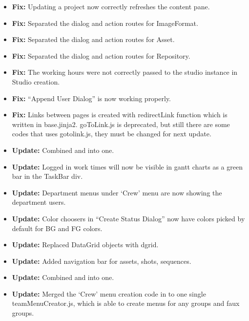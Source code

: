 \documentclass[a4paper,10pt,english]{sphinxmanual}
\begin{document}
\begin{itemize}
\begin{itemize}
\item {} 
\textbf{Fix:} Updating a project now correctly refreshes the 
content pane.

\item {} 
\textbf{Fix:} Separated the dialog and action routes for ImageFormat.

\item {} 
\textbf{Fix:} Separated the dialog and action routes for Asset.

\item {} 
\textbf{Fix:} Separated the dialog and action routes for Repository.

\item {} 
\textbf{Fix:} The working hours were not correctly passed to the studio instance
in Studio creation.

\item {} 
\textbf{Fix:} ``Append User Dialog'' is now working properly.

\item {} 
\textbf{Fix:} Links between pages is created with redirectLink function which is
written in base.jinja2. goToLink.js is deprecated, but still there are some
codes that uses gotolink.js, they must be changed for next update.

\item {} 
\textbf{Update:} Combined  and  into
one.

\item {} 
\textbf{Update:} Logged in work times will now be visible in gantt charts as a green
bar in the TaskBar div.

\item {} 
\textbf{Update:} Department menus under `Crew' menu are now showing the department
users.

\item {} 
\textbf{Update:} Color choosers in ``Create Status Dialog'' now have colors picked by
default for BG and FG colors.

\item {} 
\textbf{Update:} Replaced DataGrid objects with dgrid.

\item {} 
\textbf{Update:} Added navigation bar for assets, shots, sequences.

\item {} 
\textbf{Update:} Combined  and 
into one.

\item {} 
\textbf{Update:} Merged the `Crew' menu creation code in to one single
teamMenuCreator.js, which is able to create menus for any groups and faux
groups.


\end{itemize}
\end{itemize}
\end{document}
